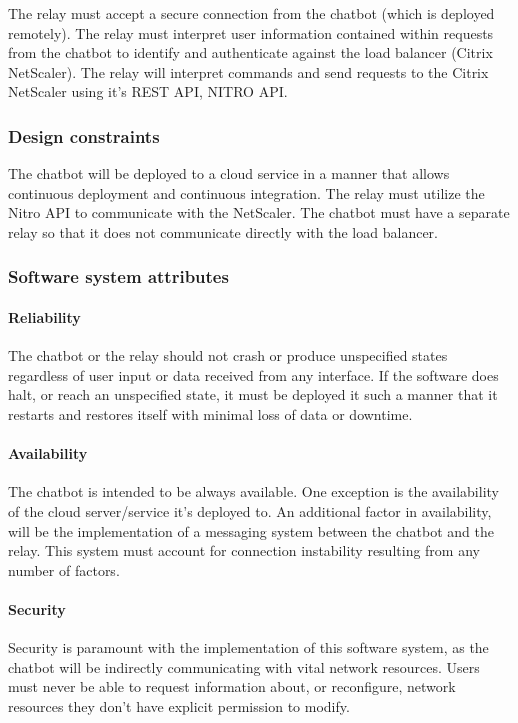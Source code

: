 The relay must accept a secure connection from the chatbot (which is deployed remotely).
The relay must interpret user information contained within requests from the chatbot to identify and authenticate against the load balancer (Citrix NetScaler).
The relay will interpret commands and send requests to the Citrix NetScaler using it's REST API, NITRO API.

\subsubsection{Design constraints}
The chatbot will be deployed to a cloud service in a manner that allows continuous deployment and continuous integration. 
The relay must utilize the Nitro API to communicate with the NetScaler. 
The chatbot must have a separate relay so that it does not communicate directly with the load balancer.

\subsubsection{Software system attributes}

\paragraph{Reliability}
The chatbot or the relay should not crash or produce unspecified states regardless of user input or data received from any interface. 
If the software does halt, or reach an unspecified state, it must be deployed it such a manner that it restarts and restores itself with minimal loss of data or downtime.

\paragraph{Availability}
The chatbot is intended to be always available.
One exception is the availability of the cloud server/service it's deployed to.
An additional factor in availability, will be the implementation of a messaging system between the chatbot and the relay.
This system must account for connection instability resulting from any number of factors.

\paragraph{Security}
Security is paramount with the implementation of this software system, as the chatbot will be indirectly communicating with vital network resources.
Users must never be able to request information about, or reconfigure, network resources they don't have explicit permission to modify.

